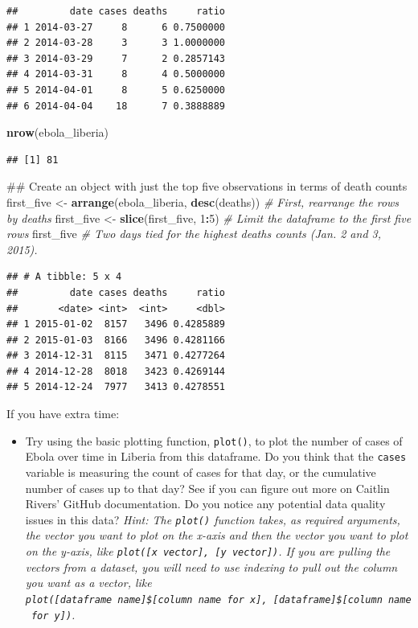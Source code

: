 \documentclass[]{book}
\makeatletter
\newenvironment{Shaded}{\begin{snugshade}}{\end{snugshade}}
\newcommand{\KeywordTok}[1]{\textcolor[rgb]{0.13,0.29,0.53}{\textbf{#1}}}
\newcommand{\DecValTok}[1]{\textcolor[rgb]{0.00,0.00,0.81}{#1}}
\newcommand{\StringTok}[1]{\textcolor[rgb]{0.31,0.60,0.02}{#1}}
\newcommand{\CommentTok}[1]{\textcolor[rgb]{0.56,0.35,0.01}{\textit{#1}}}
\newcommand{\OperatorTok}[1]{\textcolor[rgb]{0.81,0.36,0.00}{\textbf{#1}}}
\newcommand{\NormalTok}[1]{#1}
\providecommand{\tightlist}{%
  \setlength{\itemsep}{0pt}\setlength{\parskip}{0pt}}
\newenvironment{kframe}{%
\medskip{}
\setlength{\fboxsep}{.8em}
 \def\at@end@of@kframe{}%
 \ifinner\ifhmode%
  \def\at@end@of@kframe{\end{minipage}}%
  \begin{minipage}{\columnwidth}%
 \fi\fi%
 \def\FrameCommand##1{\hskip\@totalleftmargin \hskip-\fboxsep
 \colorbox{shadecolor}{##1}\hskip-\fboxsep
     \hskip-\linewidth \hskip-\@totalleftmargin \hskip\columnwidth}%
 \MakeFramed {\advance\hsize-\width
   \@totalleftmargin\z@ \linewidth\hsize
   \@setminipage}}%
 {\par\unskip\endMakeFramed%
 \at@end@of@kframe}
\renewenvironment{Shaded}{\begin{kframe}}{\end{kframe}}
\theoremstyle{definition}
\theoremstyle{definition}
\theoremstyle{definition}
\theoremstyle{remark}
\makeatother
\begin{document}
\begin{verbatim}
##         date cases deaths     ratio
## 1 2014-03-27     8      6 0.7500000
## 2 2014-03-28     3      3 1.0000000
## 3 2014-03-29     7      2 0.2857143
## 4 2014-03-31     8      4 0.5000000
## 5 2014-04-01     8      5 0.6250000
## 6 2014-04-04    18      7 0.3888889
\end{verbatim}

\begin{Shaded}
\begin{Highlighting}[]
\KeywordTok{nrow}\NormalTok{(ebola_liberia)}
\end{Highlighting}
\end{Shaded}

\begin{verbatim}
## [1] 81
\end{verbatim}

\begin{Shaded}
\begin{Highlighting}[]
\NormalTok{## Create an object with just the top five observations in terms of death counts}
\NormalTok{first_five <-}\StringTok{ }\KeywordTok{arrange}\NormalTok{(ebola_liberia, }\KeywordTok{desc}\NormalTok{(deaths)) }\CommentTok{# First, rearrange the rows by deaths}
\NormalTok{first_five <-}\StringTok{ }\KeywordTok{slice}\NormalTok{(first_five, }\DecValTok{1}\OperatorTok{:}\DecValTok{5}\NormalTok{) }\CommentTok{# Limit the dataframe to the first five rows}
\NormalTok{first_five }\CommentTok{# Two days tied for the highest deaths counts (Jan. 2 and 3, 2015).}
\end{Highlighting}
\end{Shaded}

\begin{verbatim}
## # A tibble: 5 x 4
##         date cases deaths     ratio
##       <date> <int>  <int>     <dbl>
## 1 2015-01-02  8157   3496 0.4285889
## 2 2015-01-03  8166   3496 0.4281166
## 3 2014-12-31  8115   3471 0.4277264
## 4 2014-12-28  8018   3423 0.4269144
## 5 2014-12-24  7977   3413 0.4278551
\end{verbatim}

If you have extra time:

\begin{itemize}
\tightlist
\item
  Try using the basic plotting function, \texttt{plot()}, to plot the
  number of cases of Ebola over time in Liberia from this dataframe. Do
  you think that the \texttt{cases} variable is measuring the count of
  cases for that day, or the cumulative number of cases up to that day?
  See if you can figure out more on Caitlin Rivers' GitHub
  documentation. Do you notice any potential data quality issues in this
  data? \emph{Hint: The \texttt{plot()} function takes, as required
  arguments, the vector you want to plot on the x-axis and then the
  vector you want to plot on the y-axis, like
  \texttt{plot({[}x\ vector{]},\ {[}y\ vector{]})}. If you are pulling
  the vectors from a dataset, you will need to use indexing to pull out
  the column you want as a vector, like
  \texttt{plot({[}dataframe\ name{]}\${[}column\ name\ for\ x{]},\ {[}dataframe{]}\${[}column\ name\ for\ y{]})}.}
\end{itemize}
\end{document}
